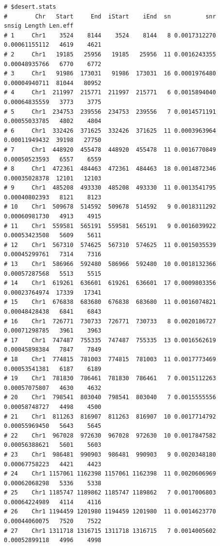 \documentclass{article}\usepackage[]{graphicx}\usepackage[]{color}
\makeatletter
\newenvironment{kframe}{%
 \def\at@end@of@kframe{}%
 \ifinner\ifhmode%
  \def\at@end@of@kframe{\end{minipage}}%
  \begin{minipage}{\columnwidth}%
 \fi\fi%
 \def\FrameCommand##1{\hskip\@totalleftmargin \hskip-\fboxsep
 \colorbox{shadecolor}{##1}\hskip-\fboxsep
     \hskip-\linewidth \hskip-\@totalleftmargin \hskip\columnwidth}%
 \MakeFramed {\advance\hsize-\width
   \@totalleftmargin\z@ \linewidth\hsize
   \@setminipage}}%
 {\par\unskip\endMakeFramed%
 \at@end@of@kframe}
\newenvironment{knitrout}{}{} %
\makeatother
\begin{document}
\begin{knitrout}
\begin{kframe}\begin{verbatim}
# $desert.stats
#        Chr   Start     End  iStart    iEnd  sn          snr         snsig Length Len.eff
# 1     Chr1    3524    8144    3524    8144   8 0.0017312270 0.00061155112   4619    4621
# 2     Chr1   19185   25956   19185   25956  11 0.0016243355 0.00048935766   6770    6772
# 3     Chr1   91986  173031   91986  173031  16 0.0001976480 0.00004940711  81044   80952
# 4     Chr1  211997  215771  211997  215771   6 0.0015894040 0.00064835559   3773    3775
# 5     Chr1  234753  239556  234753  239556   7 0.0014571191 0.00055033785   4802    4804
# 6     Chr1  332426  371625  332426  371625  11 0.0003963964 0.00011949432  39198   27750
# 7     Chr1  448920  455478  448920  455478  11 0.0016770849 0.00050523593   6557    6559
# 8     Chr1  472361  484463  472361  484463  18 0.0014872346 0.00035028378  12101   12103
# 9     Chr1  485208  493330  485208  493330  11 0.0013541795 0.00040802393   8121    8123
# 10    Chr1  509678  514592  509678  514592   9 0.0018311292 0.00060981730   4913    4915
# 11    Chr1  559581  565191  559581  565191   9 0.0016039922 0.00053423508   5609    5611
# 12    Chr1  567310  574625  567310  574625  11 0.0015035539 0.00045299761   7314    7316
# 13    Chr1  586966  592480  586966  592480  10 0.0018132366 0.00057287568   5513    5515
# 14    Chr1  619261  636601  619261  636601  17 0.0009803356 0.00023764974  17339   17341
# 15    Chr1  676838  683680  676838  683680  11 0.0016074821 0.00048428438   6841    6843
# 16    Chr1  726771  730733  726771  730733   8 0.0020186727 0.00071298785   3961    3963
# 17    Chr1  747487  755335  747487  755335  13 0.0016562619 0.00045898384   7847    7849
# 18    Chr1  774815  781003  774815  781003  11 0.0017773469 0.00053541381   6187    6189
# 19    Chr1  781830  786461  781830  786461   7 0.0015112263 0.00057075807   4630    4632
# 20    Chr1  798541  803040  798541  803040   7 0.0015555556 0.00058748727   4498    4500
# 21    Chr1  811263  816907  811263  816907  10 0.0017714792 0.00055969450   5643    5645
# 22    Chr1  967028  972630  967028  972630  10 0.0017847582 0.00056388621   5601    5603
# 23    Chr1  986481  990903  986481  990903   9 0.0020348180 0.00067758223   4421    4423
# 24    Chr1 1157061 1162398 1157061 1162398  11 0.0020606969 0.00062068298   5336    5338
# 25    Chr1 1185747 1189862 1185747 1189862   7 0.0017006803 0.00064224989   4114    4116
# 26    Chr1 1194459 1201980 1194459 1201980  11 0.0014623770 0.00044060075   7520    7522
# 27    Chr1 1311718 1316715 1311718 1316715   7 0.0014005602 0.00052899118   4996    4998

\end{verbatim}
\end{kframe}
\end{knitrout}
\end{document}
